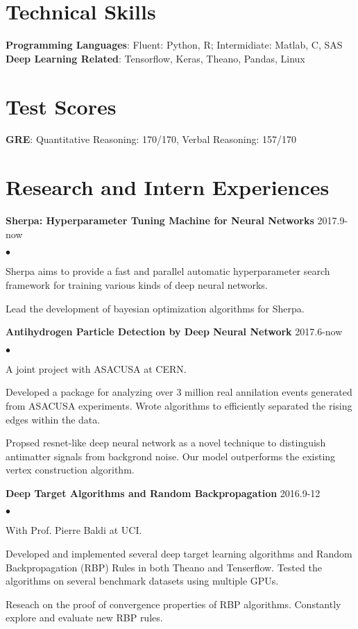 \documentclass[margin,line]{res}
\newenvironment{list2}{
  \begin{list}{$\bullet$}{%
      \setlength{\itemsep}{0in}
      \setlength{\parsep}{0in} \setlength{\parskip}{0in}
      \setlength{\topsep}{0in} \setlength{\partopsep}{0in}
      \setlength{\leftmargin}{0.2in}}}{\end{list}}
\begin{document}
\begin{resume}
\section{\sc Technical Skills}
{\bf Programming Languages}:  Fluent: Python, R; Intermidiate: Matlab, C, SAS\\
{\bf Deep Learning Related}: Tensorflow, Keras, Theano, Pandas, Linux
\section{\sc Test Scores}
{\bf GRE}: Quantitative Reasoning: 170/170, Verbal Reasoning: 157/170%
\section{\sc Research and Intern Experiences}
{\bf Sherpa: Hyperparameter Tuning Machine for Neural Networks}    \hfill{2017.9-now}
\begin{list2}
\item Sherpa aims to provide a fast and parallel automatic hyperparameter search framework for training various kinds of deep neural networks. 
\item Lead the development of bayesian optimization algorithms for Sherpa. 
\end{list2}


{\bf Antihydrogen Particle Detection by Deep Neural Network}    \hfill{2017.6-now}
\begin{list2}
\item A joint project with  ASACUSA at CERN.
\item Developed a package for analyzing over 3 million real annilation events generated from ASACUSA experiments. Wrote algorithms to efficiently separated the rising edges within the data.
\item Propsed resnet-like deep neural network as a novel technique to distinguish antimatter signals from backgrond noise. Our model outperforms the existing vertex construction algorithm.
\end{list2}

{\bf Deep Target Algorithms and Random Backpropagation}    \hfill{2016.9-12}
\begin{list2}
\item With Prof. Pierre Baldi at UCI.
\item Developed and implemented several deep target learning algorithms and Random Backpropagation (RBP) Rules in both Theano and Tenserflow. Tested the algorithms on several benchmark datasets using multiple GPUs.
\item Reseach on the proof of convergence properties of RBP algorithms. Constantly explore and evaluate new RBP rules.
\end{list2}



\end{resume}
\end{document}
